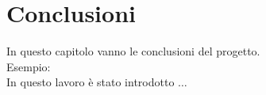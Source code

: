 \chapter*{Conclusioni} \label{cap4}
In questo capitolo vanno le conclusioni del progetto. \\ Esempio: \\ In questo lavoro è stato introdotto $\ldots$